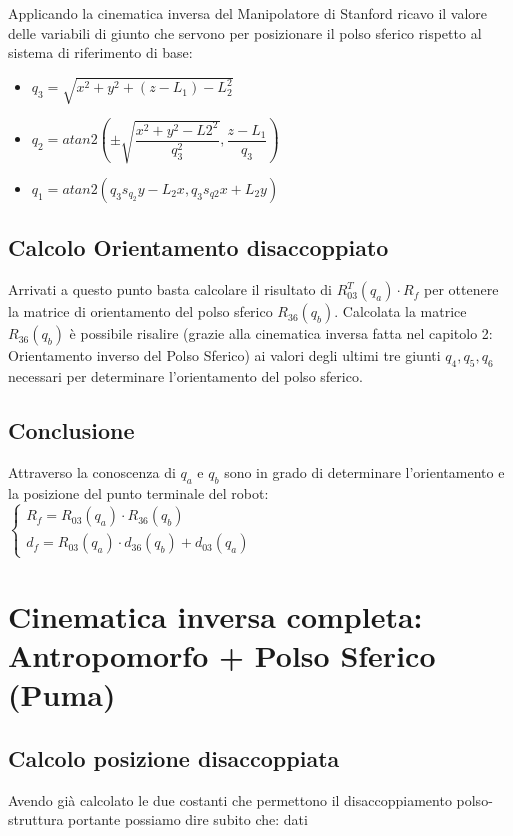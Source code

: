 \documentclass[a4paper,12pt]{article}
\begin{document}
Applicando la cinematica inversa del Manipolatore di Stanford ricavo il valore delle variabili di giunto che servono per posizionare il polso sferico rispetto al sistema di riferimento di base:
\begin{itemize}
\item $q_3 = \sqrt{x^2 +y^2+(z-L_1)-L_2^2}$
\item $q_2 = atan2(\pm\sqrt{\dfrac{x^2+y^2-L2^2}{q_3^2}},\dfrac{z-L_1}{q_3})$
\item $q_1 = atan2(q_3 s_{q_2}y-L_2x,q_3s_{q2}x+L_2y)$
\end{itemize}

\subsection{Calcolo Orientamento disaccoppiato}
Arrivati a questo punto basta calcolare il risultato di $ R_{03}^T(q_a) \cdot R_f $ per ottenere la matrice di orientamento del polso sferico $R_{36}(q_b)$. Calcolata la matrice $R_{36}(q_b)$ è possibile risalire (grazie alla cinematica inversa fatta nel capitolo 2: Orientamento inverso del Polso Sferico) ai valori degli ultimi tre giunti $q_4,q_5,q_6$ necessari per determinare l'orientamento del polso sferico.

\subsection{Conclusione}
Attraverso la conoscenza di $q_a$ e $q_b$ sono in grado di determinare l'orientamento e la posizione del punto terminale del robot:\\

		$\left\{ \begin{array} {ll} %
		R_f  = R_{03}(q_a) \cdot  R_{36}(q_b) \\
		d_f = R_{03}(q_a) \cdot d_{36}(q_b) + d_{03}(q_a)
		\end{array}
		\right.$

\newpage

\section{Cinematica inversa completa: Antropomorfo + Polso Sferico (Puma)}
\subsection{Calcolo posizione disaccoppiata}
Avendo già calcolato le due costanti che permettono il disaccoppiamento polso-struttura portante possiamo dire subito che: dati
\end{document}
